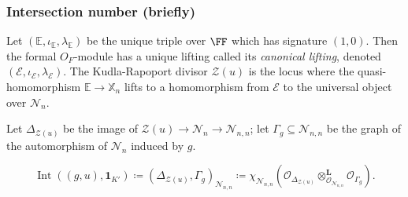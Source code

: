 \documentclass[11pt]{beamer}
\DeclareMathOperator{\Int}{Int}
\DeclareMathOperator{\Orb}{Orb}
\DeclareMathOperator{\U}{U}
\newcommand{\EE}{\mathbb{E}}
\newcommand{\HH}{\mathcal{H}}
\newcommand{\VV}{\mathbb{V}}
\newcommand{\XX}{\mathbb{X}}
\renewcommand{\OO}{O}
\newcommand{\RZ}{\mathcal{N}}
\newcommand{\Sheaf}{\mathcal O}
\newcommand{\ZD}{\mathcal{Z}}
\newcommand{\guv}{{(\gamma, \uu, \vv^\top)}}
\newcommand{\jiao}{\mathop{\otimes}^{\mathbf{L}}} %
\newcommand{\uu}{\mathbf{u}}
\newcommand{\vv}{\mathbf{v}}
\begin{document}

\begin{frame}
  \frametitle{Intersection number (briefly)}
  \begin{definition}
    Let $(\EE, \iota_\EE, \lambda_\EE)$ be the unique triple over $\FF$
    which has signature $(1,0)$.
    Then the formal $\OO_F$-module has a unique lifting called its \emph{canonical lifting},
    denoted $(\mathcal{E}, \iota_{\mathcal{E}}, \lambda_{\mathcal E})$.
    The \alert{Kudla-Rapoport divisor $\ZD(u)$}
    is the locus where the quasi-homomorphism $\EE \to \XX_n$ lifts to a homomorphism
    from $\mathcal{E}$ to the universal object over $\RZ_n$.
  \end{definition}
  Let $\Delta_{\ZD(u)}$ be the image of $\ZD(u) \to \RZ_n \to \RZ_{n,n}$;
  let $\Gamma_g \subseteq \RZ_{n,n}$ be the graph of the automorphism of $\RZ_n$ induced by $g$.
  \begin{definition}
    \[
      \Int((g,u), \mathbf{1}_{K'})
      \coloneqq \left( \Delta_{\ZD(u)}, \Gamma_g \right)_{\RZ_{n,n}}
      \coloneqq \chi_{\RZ_{n,n}}
      \left( \Sheaf_{\Delta_{\ZD(u)}} \jiao_{\Sheaf_{\RZ_{n,n}}} \Sheaf_{\Gamma_g}  \right).
    \]
  \end{definition}
\end{frame}
\end{document}
